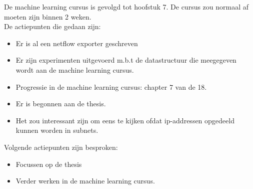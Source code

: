 \noindent De machine learning cursus is gevolgd tot hoofstuk 7. De cursus zou normaal af moeten zijn binnen 2 weken. \\

\noindent De actiepunten die gedaan zijn:
\begin{itemize}  
		\item Er is al een netflow exporter geschreven
        \item Er zijn experimenten uitgevoerd m.b.t de datastructuur die meegegeven wordt aan de machine learning cursus.
        \item Progressie in de machine learning cursus: chapter 7 van de 18.
        \item Er is begonnen aan de thesis. 
        \item Het zou interessant zijn om eens te kijken ofdat ip-addressen opgedeeld kunnen worden in subnets.
\end{itemize}

\noindent Volgende actiepunten zijn besproken:
\begin{itemize}  
        \item Focussen op de thesis
        \item Verder werken in de machine learning cursus.
\end{itemize}